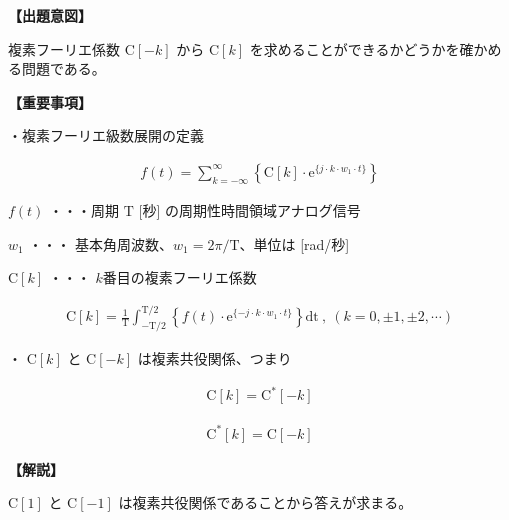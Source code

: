\noindent \textbf{【出題意図】}

\bigskip
\noindent 複素フーリエ係数 $\textrm{C}[-k]$ から $\textrm{C}[k]$ を求めることができるかどうかを確かめる問題である。

\vspace{1em}
\noindent \textbf{【重要事項】}

\medskip
\noindent ・複素フーリエ級数展開の定義

\begin{align*}
f(t) = \sum_{k = -\infty}^{\infty} 
\left \{
\textrm{C}[k] \cdot \textrm{e}^{\{j \cdot k \cdot w_1 \cdot t \}}
\right \}
\end{align*}

\medskip
\noindent $f(t)$ ・・・周期 $\textrm{T}$ [秒] の周期性時間領域アナログ信号

\medskip
\noindent $w_1$ ・・・ 基本角周波数、$w_1 = 2\pi/\textrm{T}$、単位は [rad/秒]

\medskip
\noindent $\textrm{C}[k]$ ・・・ $k$番目の複素フーリエ係数

\begin{align*}
\textrm{C}[k] = \frac{1}{\textrm{T}} \int_{-\textrm{T}/2}^{\textrm{T}/2} 
\left \{
f(t) \cdot \textrm{e}^{\{-j \cdot k \cdot w_1 \cdot t \}} 
\right \}
\textrm{dt}
\ ,\  (k = 0, \pm 1, \pm 2, \cdots)
\end{align*}

\bigskip
\noindent ・ $\textrm{C}[k]$ と $\textrm{C}[-k]$ は複素共役関係、つまり

\begin{align*}
\textrm{C}[k] = \textrm{C}^{*}[-k]
\end{align*}

\begin{align*}
\textrm{C}^{*}[k] = \textrm{C}[-k]
\end{align*}

\bigskip

\vspace{1em}
\noindent \textbf{【解説】}

\bigskip
\noindent $\textrm{C}[1]$ と $\textrm{C}[-1]$ は複素共役関係であることから答えが求まる。
